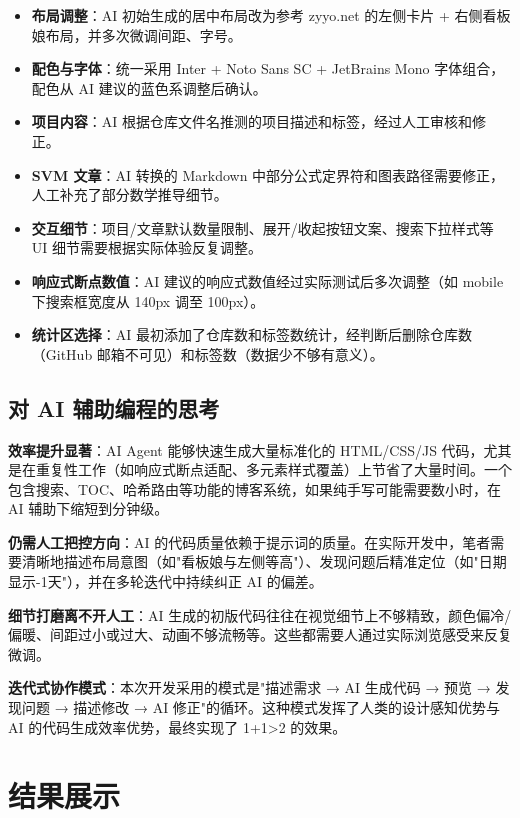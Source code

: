 \documentclass[12pt, a4paper]{article}
\begin{document}
\begin{itemize}[leftmargin=*]
    \item \textbf{布局调整}：AI 初始生成的居中布局改为参考 zyyo.net 的左侧卡片 + 右侧看板娘布局，并多次微调间距、字号。
    \item \textbf{配色与字体}：统一采用 Inter + Noto Sans SC + JetBrains Mono 字体组合，配色从 AI 建议的蓝色系调整后确认。
    \item \textbf{项目内容}：AI 根据仓库文件名推测的项目描述和标签，经过人工审核和修正。
    \item \textbf{SVM 文章}：AI 转换的 Markdown 中部分公式定界符和图表路径需要修正，人工补充了部分数学推导细节。
    \item \textbf{交互细节}：项目/文章默认数量限制、展开/收起按钮文案、搜索下拉样式等 UI 细节需要根据实际体验反复调整。
    \item \textbf{响应式断点数值}：AI 建议的响应式数值经过实际测试后多次调整（如 mobile 下搜索框宽度从 140px 调至 100px）。
    \item \textbf{统计区选择}：AI 最初添加了仓库数和标签数统计，经判断后删除仓库数（GitHub 邮箱不可见）和标签数（数据少不够有意义）。
\end{itemize}

\subsection{对 AI 辅助编程的思考}

\textbf{效率提升显著}：AI Agent 能够快速生成大量标准化的 HTML/CSS/JS 代码，尤其是在重复性工作（如响应式断点适配、多元素样式覆盖）上节省了大量时间。一个包含搜索、TOC、哈希路由等功能的博客系统，如果纯手写可能需要数小时，在 AI 辅助下缩短到分钟级。

\textbf{仍需人工把控方向}：AI 的代码质量依赖于提示词的质量。在实际开发中，笔者需要清晰地描述布局意图（如"看板娘与左侧等高"）、发现问题后精准定位（如"日期显示-1天"），并在多轮迭代中持续纠正 AI 的偏差。

\textbf{细节打磨离不开人工}：AI 生成的初版代码往往在视觉细节上不够精致，颜色偏冷/偏暖、间距过小或过大、动画不够流畅等。这些都需要人通过实际浏览感受来反复微调。

\textbf{迭代式协作模式}：本次开发采用的模式是"描述需求 → AI 生成代码 → 预览 → 发现问题 → 描述修改 → AI 修正"的循环。这种模式发挥了人类的设计感知优势与 AI 的代码生成效率优势，最终实现了 1+1>2 的效果。

\section{结果展示}
\end{document}
